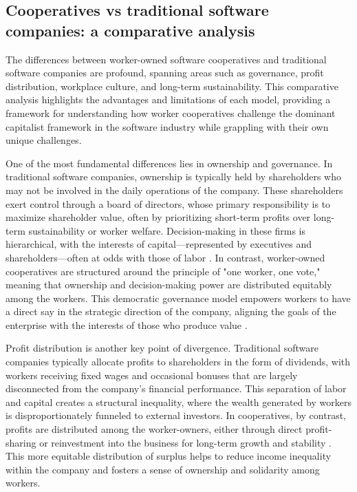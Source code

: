 \begin{refsection}
\subsection{Cooperatives vs traditional software companies: a comparative analysis}

The differences between worker-owned software cooperatives and traditional software companies are profound, spanning areas such as governance, profit distribution, workplace culture, and long-term sustainability. This comparative analysis highlights the advantages and limitations of each model, providing a framework for understanding how worker cooperatives challenge the dominant capitalist framework in the software industry while grappling with their own unique challenges.

One of the most fundamental differences lies in ownership and governance. In traditional software companies, ownership is typically held by shareholders who may not be involved in the daily operations of the company. These shareholders exert control through a board of directors, whose primary responsibility is to maximize shareholder value, often by prioritizing short-term profits over long-term sustainability or worker welfare. Decision-making in these firms is hierarchical, with the interests of capital—represented by executives and shareholders—often at odds with those of labor \cite[pp.~55-57]{schweickart2002}. In contrast, worker-owned cooperatives are structured around the principle of "one worker, one vote," meaning that ownership and decision-making power are distributed equitably among the workers. This democratic governance model empowers workers to have a direct say in the strategic direction of the company, aligning the goals of the enterprise with the interests of those who produce value \cite[pp.~35-37]{restakis2012}.

Profit distribution is another key point of divergence. Traditional software companies typically allocate profits to shareholders in the form of dividends, with workers receiving fixed wages and occasional bonuses that are largely disconnected from the company’s financial performance. This separation of labor and capital creates a structural inequality, where the wealth generated by workers is disproportionately funneled to external investors. In cooperatives, by contrast, profits are distributed among the worker-owners, either through direct profit-sharing or reinvestment into the business for long-term growth and stability \cite[pp.~144-146]{wright2010}. This more equitable distribution of surplus helps to reduce income inequality within the company and fosters a sense of ownership and solidarity among workers.


\end{refsection}
